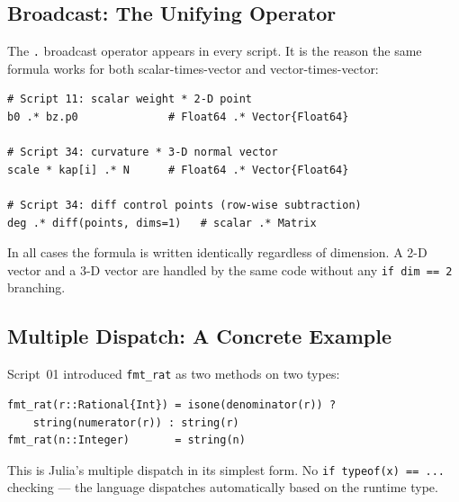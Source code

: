 \documentclass[12pt, a4paper]{article}
\newcommand{\cd}[1]{\texttt{#1}}
\begin{document}
\subsection{Broadcast: The Unifying Operator}

The \cd{.} broadcast operator appears in every script.
It is the reason the same formula works for both
scalar-times-vector and vector-times-vector:

\begin{verbatim}
# Script 11: scalar weight * 2-D point
b0 .* bz.p0              # Float64 .* Vector{Float64}

# Script 34: curvature * 3-D normal vector
scale * kap[i] .* N      # Float64 .* Vector{Float64}

# Script 34: diff control points (row-wise subtraction)
deg .* diff(points, dims=1)   # scalar .* Matrix
\end{verbatim}

In all cases the formula is written identically regardless
of dimension.
A 2-D vector and a 3-D vector are handled by the same
code without any \cd{if dim == 2} branching.

\subsection{Multiple Dispatch: A Concrete Example}

Script~01 introduced \cd{fmt\_rat} as two methods on two types:

\begin{verbatim}
fmt_rat(r::Rational{Int}) = isone(denominator(r)) ?
    string(numerator(r)) : string(r)
fmt_rat(n::Integer)       = string(n)
\end{verbatim}

This is Julia's multiple dispatch in its simplest form.
No \cd{if typeof(x) == ...} checking --- the language
dispatches automatically based on the runtime type.

\begin{center}
\end{center}
\end{document}
